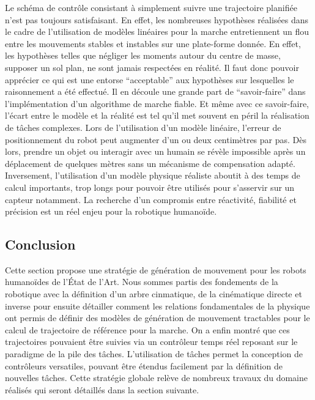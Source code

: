 Le schéma de contrôle consistant à simplement suivre une trajectoire
planifiée n'est pas toujours satisfaisant. En effet, les nombreuses
hypothèses réalisées dans le cadre de l'utilisation de modèles
linéaires pour la marche entretiennent un flou entre les mouvements
stables et instables sur une plate-forme donnée. En effet, les
hypothèses telles que négliger les moments autour du centre de masse,
supposer un sol plan, ne sont jamais respectées en réalité. Il faut
donc pouvoir apprécier ce qui est une entorse ``acceptable'' aux
hypothèses sur lesquelles le raisonnement a été effectué. Il en
découle une grande part de ``savoir-faire'' dans l'implémentation d'un
algorithme de marche fiable. Et même avec ce savoir-faire, l'écart
entre le modèle et la réalité est tel qu'il met souvent en péril la
réalisation de tâches complexes. Lors de l'utilisation d'un modèle
linéaire, l'erreur de positionnement du robot peut augmenter d'un ou
deux centimètres par pas. Dès lors, prendre un objet ou interagir avec
un humain se révèle impossible après un déplacement de quelques mètres
sans un mécanisme de compensation adapté. Inversement, l'utilisation
d'un modèle physique réaliste aboutit à des temps de calcul
importants, trop longs pour pouvoir être utilisés pour s'asservir sur
un capteur notamment. La recherche d'un compromis entre réactivité,
fiabilité et précision est un réel enjeu pour la robotique humanoïde.


\subsection{Conclusion}

Cette section propose une stratégie de génération de mouvement pour
les robots humanoïdes de l'État de l'Art. Nous sommes partis des
fondements de la robotique avec la définition d'un arbre cinmatique,
de la cinématique directe et inverse pour ensuite détailler comment
les relations fondamentales de la physique ont permis de définir des
modèles de génération de mouvement tractables pour le calcul de
trajectoire de référence pour la marche. On a enfin montré que ces
trajectoires pouvaient être suivies via un contrôleur temps réel
reposant sur le paradigme de la pile des tâches. L'utilisation de
tâches permet la conception de contrôleurs versatiles, pouvant être
étendus facilement par la définition de nouvelles tâches. Cette
stratégie globale relève de nombreux travaux du domaine réalisés qui
seront détaillés dans la section suivante.



